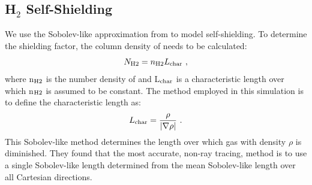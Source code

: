\documentclass[fleqn,usenatbib]{mnras}
\begin{document}
\subsection{\texorpdfstring{H$_2$}{H2} Self-Shielding}
We use the Sobolev-like approximation from \citet{Wolcott11} to model \hh{} self-shielding. To determine the \hh{} shielding factor, the column density of \hh{} needs to be calculated:
\begin{equation} \label{Nh2}
	N_{\rm H2} = n_{\rm H2}L_{\rm char} \ ,
\end{equation}
where n$_{\rm H2}$ is the number density of \hh{} and L$_{\rm char}$ is a characteristic length over which n$_{\rm H2}$ is assumed to be constant. The method employed in this simulation is to define the characteristic length as:
\begin{equation} \label{Lchar}
	L_{\rm char} = \frac{\rho}{|\nabla \rho|} \ . 
\end{equation}
This Sobolev-like method determines the length over which gas with density $\rho$ is diminished. They found that the most accurate, non-ray tracing, method is to use a single Sobolev-like length determined from the mean Sobolev-like length over all Cartesian directions. 
\end{document}
